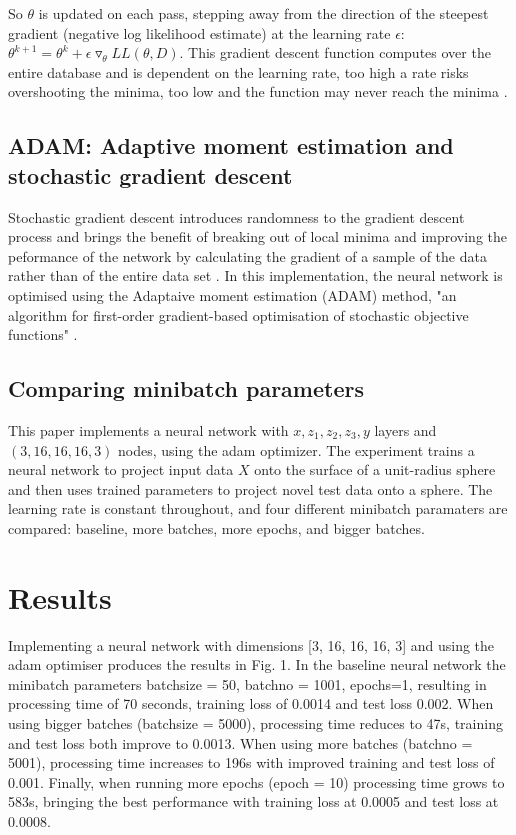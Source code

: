 \documentclass{article}
\begin{document}
So $\theta$ is updated on each pass, stepping away from the direction of the steepest gradient (negative log likelihood estimate) at the learning rate $\epsilon$:  $\theta^{k+1} = \theta^k + \epsilon \triangledown_{\theta}LL(\theta, D)$.  This gradient descent function computes over the entire database and is dependent on the learning rate, too high a rate risks overshooting the minima, too low and the function may never reach the minima \cite{bottou2007tradeoffs}.  

\subsection{ADAM: Adaptive moment estimation and stochastic gradient descent}
\label{ssec:adam}

Stochastic gradient descent introduces randomness to the gradient descent process and brings the benefit of breaking out of local minima and improving the peformance of the network by calculating the gradient of a sample of the data rather than of the entire data set \cite{bottou2012stochastic}.  In this implementation, the neural network is optimised using the Adaptaive moment estimation (ADAM) method, "an algorithm for first-order gradient-based optimisation of stochastic objective functions" \cite {KingmaBa2015}. 

\subsection{Comparing minibatch parameters}
\label{ssec:minibatch}

This paper implements a neural network with $x, z_1, z_2, z_3, y$ layers and $(3, 16, 16, 16, 3)$ nodes, using the adam optimizer.  The experiment trains a neural network to project input data $X$ onto the surface of a unit-radius sphere and then uses trained parameters to project novel test data onto a sphere.  The learning rate is constant throughout, and four different minibatch paramaters are compared:  baseline, more batches, more epochs, and bigger batches.

\section{Results}
\label{sec:results}

Implementing a neural network with dimensions [3, 16, 16, 16, 3] and using the adam optimiser produces the results in Fig. 1.  In the baseline neural network the minibatch parameters batchsize = 50, batchno = 1001, epochs=1, resulting in processing time of 70 seconds, training loss of 0.0014 and test loss 0.002.  When using bigger batches (batchsize = 5000), processing time reduces to 47s, training and test loss both improve to 0.0013.  When using more batches (batchno = 5001), processing time increases to 196s with improved training and test loss of 0.001.  Finally, when running more epochs (epoch = 10) processing time grows to 583s, bringing the best performance with training loss at 0.0005 and test loss at 0.0008.
\end{document}
